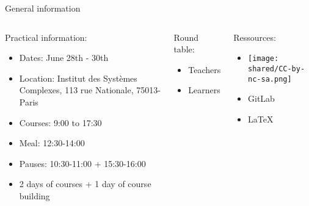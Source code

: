\documentclass{beamer}
\begin{document}
\begin{frame}{General information}
\begin{columns}
\begin{block}{Practical information:}
\begin{itemize}
    \item Dates: June 28th - 30th
    \item Location: Institut des Systèmes Complexes, 113 rue Nationale, 75013-Paris
    \item Courses: 9:00 to 17:30
    \item Meal: 12:30-14:00
    \item Pauses: 10:30-11:00 + 15:30-16:00
    \item 2 days of courses + 1 day of course building
\end{itemize}
\end{block}
\begin{block}{Round table:}
    \begin{itemize}
        \item Teachers 
        \item Learners
    \end{itemize}
\end{block}
\begin{block}{Ressources:}
    \begin{itemize}
        \item \texttt{[image: shared/CC-by-nc-sa.png]}
        \item GitLab
        \item \LaTeX
    \end{itemize}
\end{block}
\end{columns}
\end{frame}
\end{document}

